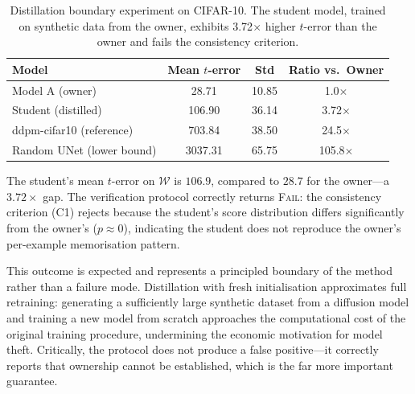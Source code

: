 \documentclass{article}
\begin{document}
\begin{table}[!htbp]
\caption{Distillation boundary experiment on CIFAR-10.
The student model, trained on synthetic data from the owner,
exhibits 3.72$\times$ higher $t$-error than the owner and fails
the consistency criterion.}
\label{tab:distillation}
\centering
\small
\begin{tabular}{@{}lccc@{}}
\toprule
Model & Mean $t$-error & Std & Ratio vs.\ Owner \\
\midrule
Model A (owner) & 28.71 & 10.85 & 1.0$\times$ \\
Student (distilled) & 106.90 & 36.14 & 3.72$\times$ \\
\addlinespace
ddpm-cifar10 (reference) & 703.84 & 38.50 & 24.5$\times$ \\
Random UNet (lower bound) & 3037.31 & 65.75 & 105.8$\times$ \\
\bottomrule
\end{tabular}
\end{table}

The student's mean $t$-error on $\mathcal{W}$ is $106.9$, compared to
$28.7$ for the owner—a $3.72\times$ gap. The verification protocol correctly returns \textsc{Fail}: the consistency criterion (C1) rejects because the student's score distribution differs significantly from the owner's ($p \approx 0$), indicating the student does not reproduce the owner's per-example memorisation pattern.

This outcome is expected and represents a principled boundary of the
method rather than a failure mode.  Distillation with fresh
initialisation approximates full retraining: generating a sufficiently
large synthetic dataset from a diffusion model and training a new model
from scratch approaches the computational cost of the original
training procedure, undermining the economic motivation for model theft.
Critically, the protocol does not produce a false positive---it
correctly reports that ownership cannot be established, which is the
far more important guarantee.


\newpage

\end{document}
